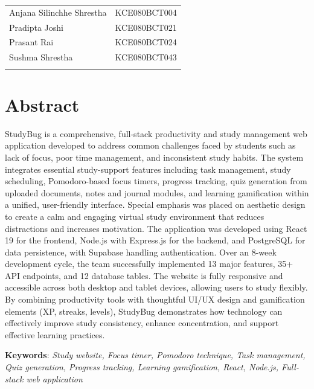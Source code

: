 			\begin{tabular}{p{2in}p{3in}}
    			Anjana Silinchhe Shrestha & KCE080BCT004\\
    			Pradipta Joshi & KCE080BCT021\\
    			Prasant Rai & KCE080BCT024\\
    			Sushma Shrestha & KCE080BCT043\\
    		 \vspace{0.3in}
    		\end{tabular}
		\break

		\large
			\chapter*{Abstract}
		\normalsize
		StudyBug is a comprehensive, full-stack productivity and study management web application developed to address common challenges faced by students such as lack of focus, poor time management, and inconsistent study habits. The system integrates essential study-support features including task management, study scheduling, Pomodoro-based focus timers, progress tracking, quiz generation from uploaded documents, notes and journal modules, and learning gamification within a unified, user-friendly interface. Special emphasis was placed on aesthetic design to create a calm and engaging virtual study environment that reduces distractions and increases motivation. The application was developed using React 19 for the frontend, Node.js with Express.js for the backend, and PostgreSQL for data persistence, with Supabase handling authentication. Over an 8-week development cycle, the team successfully implemented 13 major features, 35+ API endpoints, and 12 database tables. The website is fully responsive and accessible across both desktop and tablet devices, allowing users to study flexibly. By combining productivity tools with thoughtful UI/UX design and gamification elements (XP, streaks, levels), StudyBug demonstrates how technology can effectively improve study consistency, enhance concentration, and support effective learning practices.

		\textbf{Keywords}:\textit{ Study website, Focus timer, Pomodoro technique, Task management, Quiz generation, Progress tracking, Learning gamification, React, Node.js, Full-stack web application}

		\break

		\tableofcontents

